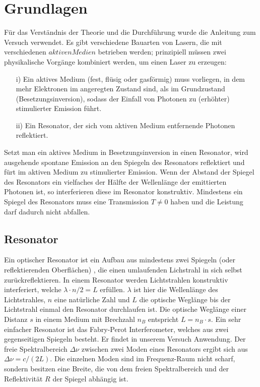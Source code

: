\documentclass[a4paper,10pt]{scrartcl} %
\begin{document}
\section{Grundlagen}
\label{sec:Grundlagen}
Für das Verständnis der Theorie und die Durchführung wurde die Anleitung zum Versuch \cite{Anleitung} verwendet.
Es gibt verschiedene Bauarten von Lasern, die mit verschiedenen $aktiven Medien$ betrieben werden; prinzipiell müssen zwei physikalische Vorgänge kombiniert werden, um einen Laser zu erzeugen:
\begin{itemize}
\item[i)] Ein aktives Medium (fest, flüsig oder gasförmig) muss vorliegen, in dem mehr Elektronen im angeregten Zustand sind, als im Grundzustand (Besetzungsinversion), sodass der Einfall von Photonen zu (erhöhter) stimulierter Emission führt.
\item[ii)] Ein Resonator, der sich vom aktiven Medium entfernende Photonen reflektiert.
\end{itemize}
Setzt man ein aktives Medium in Besetzungsinversion in einen Resonator, wird ausgehende spontane Emission an den Spiegeln des Resonators reflektiert und fürt im aktiven Medium zu stimulierter Emission. Wenn der Abstand der Spiegel des Resonators ein vielfaches der Hälfte der Wellenlänge der emittierten Photonen ist, so interferieren diese im Resonator konstruktiv. Mindestens ein Spiegel des Resonators muss eine Transmission $T \neq 0$ haben und die Leistung darf dadurch nicht abfallen.
\subsection{Resonator}
Ein optischer Resonator ist ein Aufbau aus mindestens zwei Spiegeln (oder reflektierenden Oberflächen) , die einen umlaufenden Lichstrahl in sich selbst zurückreflektieren. In einem Resonator werden Lichtstrahlen konstruktiv interferiert, welche $\lambda \cdot n / 2 = L$ erfüllen. $\lambda$ ist hier die Wellenlänge des Lichtstrahles, $n$ eine natürliche Zahl und $L$ die optische Weglänge bis der Lichtstrahl einmal den Resonator durchlaufen ist. Die optische Weglänge einer Distanz $s$ in einem Medium mit Brechzahl $n_B$ entspricht $L = n_B \cdot s$. Ein sehr einfacher Resonator ist das Fabry-Perot Interferometer, welches aus zwei gegenseitigen Spiegeln besteht. Er findet in unserem Versuch Anwendung. Der freie Spektralbereich $\Delta \nu$ zwischen zwei Moden eines Resonators ergibt sich aus $\Delta \nu = c/(2L)$. Die einzelnen Moden sind im Frequenz-Raum nicht scharf, sondern besitzen eine Breite, die von dem freien Spektralbereich und der Reflektivität $R$ der Spiegel abhängig ist.
\end{document}
